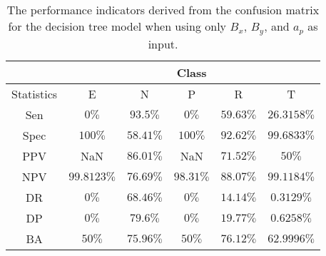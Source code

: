 \begin{table}[!ht]
	\centering
	\begin{tabular}{|c|c|c|c|c|c|}
		\hline
		 & \multicolumn{5}{c|}{Class} \\ \hline
		Statistics & E & N & P & R & T \\ \hline
		Sen & $0\%$ & $93.5\%$ & $0\%$ & $59.63\%$ & $26.3158\%$ \\ \hline
		Spec & $100\%$ & $58.41\%$ & $100\%$ & $92.62\%$ & $99.6833\%$ \\ \hline
		PPV & NaN & $86.01\%$ & NaN & $71.52\%$ & $50\%$ \\ \hline
		NPV & $99.8123\%$ & $76.69\%$ & $98.31\%$ & $88.07\%$ & $99.1184\%$ \\ \hline
		DR & $0\%$ & $68.46\%$ & $0\%$ & $14.14\%$ & $0.3129\%$ \\ \hline
		DP & $0\%$ & $79.6\%$ & $0\%$ & $19.77\%$ & $0.6258\%$ \\ \hline
		BA & $50\%$ & $75.96\%$ & $50\%$ & $76.12\%$ & $62.9996\%$ \\ \hline
	\end{tabular}
	\caption{The performance indicators derived from the confusion matrix for the decision tree model when using only $B_{x}$, $B_{y}$, and $a_{p}$ as input.}
	\label{tab:cs:reverse:xyap:C5.0}
\end{table}
